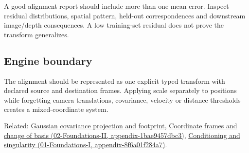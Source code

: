 A good alignment report should include more than one mean error. Inspect residual distributions, spatial pattern, held-out correspondences and downstream image/depth consequences. A low training-set residual does not prove the transform generalizes.

\subsection{Engine boundary}\label{appendix-5f40b4fea463-engine-boundary}

The alignment should be represented as one explicit typed transform with declared source and destination frames. Applying scale separately to positions while forgetting camera translations, covariance, velocity or distance thresholds creates a mixed-coordinate system.

Related: \hyperref[appendix-24269cb6977c]{Gaussian covariance projection and footprint}, \href{../02-Foundations-II/main.pdf\#nameddest=appendix-1bae9457dbc3}{Coordinate frames and change of basis (02-Foundations-II, appendix-1bae9457dbc3)}, \href{../01-Foundations-I/main.pdf\#nameddest=appendix-8f6a01f284a7}{Conditioning and singularity (01-Foundations-I, appendix-8f6a01f284a7)}.
